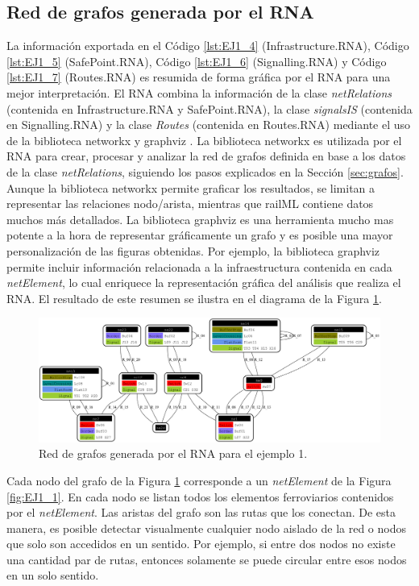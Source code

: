 \subsection{Red de grafos generada por el RNA}
	
 	La información exportada en el Código \ref{lst:EJ1_4} (Infrastructure.RNA), Código \ref{lst:EJ1_5} (SafePoint.RNA), Código \ref{lst:EJ1_6} (Signalling.RNA) y Código \ref{lst:EJ1_7} (Routes.RNA) es resumida de forma gráfica por el RNA para una mejor interpretación. El RNA combina la información de la clase \textit{netRelations} (contenida en Infrastructure.RNA y SafePoint.RNA), la clase \textit{signalsIS} (contenida en Signalling.RNA) y la clase \textit{Routes} (contenida en Routes.RNA) mediante el uso de la biblioteca networkx \cite{NETWORKX} y graphviz \cite{GRAPHVIZ}. La biblioteca networkx es utilizada por el RNA para crear, procesar y analizar la red de grafos definida en base a los datos de la clase \textit{netRelations}, siguiendo los pasos explicados en la Sección \ref{sec:grafos}. Aunque la biblioteca networkx permite graficar los resultados, se limitan a representar las relaciones nodo/arista, mientras que railML contiene datos muchos más detallados. La biblioteca graphviz es una herramienta mucho mas potente a la hora de representar gráficamente un grafo y es posible una mayor personalización de las figuras obtenidas. Por ejemplo, la biblioteca graphviz permite incluir información relacionada a la infraestructura contenida en cada \textit{netElement}, lo cual enriquece la representación gráfica del análisis que realiza el RNA. El resultado de este resumen se ilustra en el diagrama de la Figura \ref{fig:EJ1_8}.

	\begin{figure}[H]
		\centering
		\includegraphics[origin = c, width=\textwidth]{Figuras/Graph_1}
		\centering\caption{Red de grafos generada por el RNA para el ejemplo 1.}
		\label{fig:EJ1_8}
	\end{figure}
	
	Cada nodo del grafo de la Figura \ref{fig:EJ1_8} corresponde a un \textit{netElement} de la Figura \ref{fig:EJ1_1}. En cada nodo se listan todos los elementos ferroviarios contenidos por el \textit{netElement}. Las aristas del grafo son las rutas que los conectan. De esta manera, es posible detectar visualmente cualquier nodo aislado de la red o nodos que solo son accedidos en un sentido. Por ejemplo, si entre dos nodos no existe una cantidad par de rutas, entonces solamente se puede circular entre esos nodos en un solo sentido.